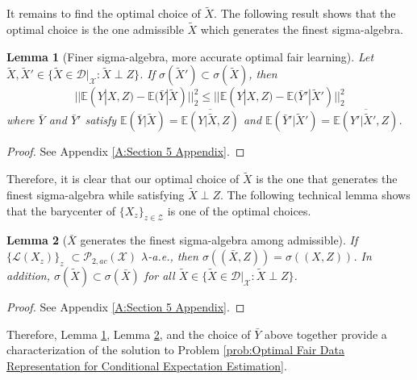 \documentclass[twoside,11pt]{article}
\newtheorem{lem}{Lemma}[section]{\bfseries}{\itshape}
\begin{document}
It remains to find the optimal choice of $\tilde{X}$. The following result shows that the optimal choice is the one admissible $\tilde{X}$ which generates the finest sigma-algebra.

\begin{lem}[Finer sigma-algebra, more accurate optimal fair learning] \label{l:Finer Sigma-algebra Implies More Accurate Optimal Fair Learning}
Let $\tilde{X}, \tilde{X}' \in \{\tilde{X} \in \mathcal{D}|_{\mathcal{X}}: \tilde{X} \perp Z\}$. If $\sigma(\tilde{X}') \subset \sigma(\tilde{X})$, then
\begin{equation}
||\mathbb{E}(Y|X,Z) - \mathbb{E}(\bar{Y}|\tilde{X})||^2_2 \leq ||\mathbb{E}(Y|X,Z) - \mathbb{E}(\bar{Y}'|\tilde{X}')||^2_2
\end{equation}
where $\bar{Y}$ and $\bar{Y}'$ satisfy $\mathbb{E}(\bar{Y}|\tilde{X}) = \overline{\mathbb{E}(Y| \tilde{X},Z)}$ and $\mathbb{E}(\bar{Y}'|\tilde{X}') = \overline{\mathbb{E}(Y'| \tilde{X}',Z)}$.
\end{lem}

\begin{proof}
See Appendix \ref{A:Section 5 Appendix}.
\end{proof}

Therefore, it is clear that our optimal choice of $\tilde{X}$ is the one that generates the finest sigma-algebra while satisfying $\tilde{X} \perp Z$. The following technical lemma shows that the barycenter of $\{X_z\}_{z \in \mathcal{Z}}$ is one of the optimal choices.

\begin{lem}[$\bar{X}$ generates the finest sigma-algebra among admissible]\label{l:X Bar Generates the Finest Sigma-algebra} If $\{\mathcal{L}(X_z)\}_z$ $\subset \mathcal{P}_{2,ac}(\mathcal{X})$ $\lambda$-a.e., then $\sigma((\bar{X},Z)) = \sigma((X,Z))$. In addition, $\sigma(\tilde{X}) \subset \sigma(\bar{X})$ for all $\tilde{X} \in \{\tilde{X} \in \mathcal{D}|_{\mathcal{X}} : \tilde{X} \perp Z\}$.
\end{lem}

\begin{proof}
See Appendix \ref{A:Section 5 Appendix}.
\end{proof}

Therefore, Lemma \ref{l:Finer Sigma-algebra Implies More Accurate Optimal Fair Learning}, Lemma \ref{l:X Bar Generates the Finest Sigma-algebra}, and the choice of $\bar{Y}$ above together provide a characterization of the solution to Problem \ref{prob:Optimal Fair Data Representation for Conditional Expectation Estimation}.
\end{document}

